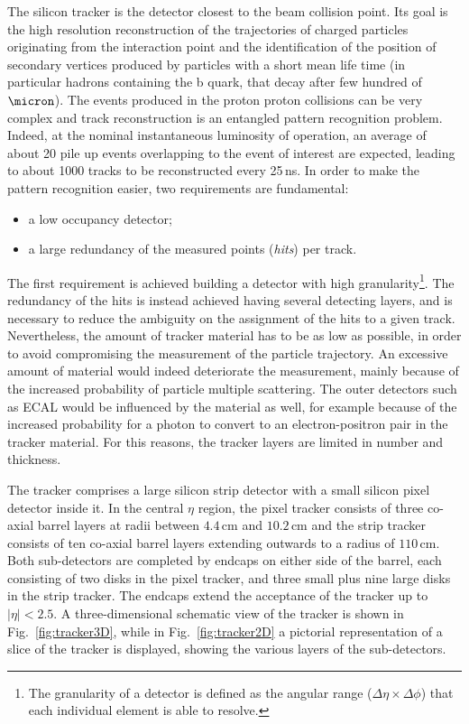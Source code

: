 The silicon tracker is the detector closest to the beam collision point. Its goal is the high resolution reconstruction of the trajectories of charged particles originating from the interaction point and the identification of the position of secondary vertices produced by particles with a short mean life time (in particular hadrons containing the b quark, that decay after few hundred of $\micron$). The events produced in the proton proton collisions can be very complex and track reconstruction is an entangled pattern recognition problem. Indeed, at the nominal instantaneous luminosity of operation, an average of about 20 pile up events overlapping to the event of interest are expected, leading to about 1000 tracks to be reconstructed every 25\,ns. In order to make the pattern recognition easier, two requirements are fundamental:
\begin{itemize}
\item a low occupancy detector;
\item a large redundancy of the measured points (\emph{hits}) per track.
\end{itemize}
The first requirement is achieved building a detector with high granularity\footnote{The granularity of a detector is defined as the angular range ($\Delta\eta\times\Delta\phi$) that each individual element is able to resolve.}. The redundancy of the hits is instead achieved having several detecting layers, and is necessary to reduce the ambiguity on the assignment of the hits to a given track. Nevertheless, the amount of tracker material has to be as low as possible, in order to avoid compromising the measurement of the particle trajectory. An excessive amount of material would indeed deteriorate the measurement, mainly because of the increased probability of particle multiple scattering. The outer detectors such as ECAL would be influenced by the material as well, for example because of the increased probability for a photon to convert to an electron-positron pair in the tracker material. For this reasons, the tracker layers are limited in number and thickness.

The tracker comprises a large silicon strip detector with a small silicon pixel detector inside it. In the central $\eta$ region, the pixel tracker consists of three co-axial barrel layers at radii between $4.4$\,cm and $10.2$\,cm and the strip tracker consists of ten co-axial barrel layers extending outwards to a radius of $110$\,cm. Both sub-detectors are completed by endcaps on either
side of the barrel, each consisting of two disks in the pixel tracker, and three small plus nine large disks in the strip tracker. The endcaps extend the acceptance of the tracker up to $|\eta|<2.5$. A three-dimensional schematic view of the tracker is shown in Fig.~\ref{fig:tracker3D}, while in Fig.~\ref{fig:tracker2D} a pictorial representation of a slice of the tracker is displayed, showing the various layers of the sub-detectors.

